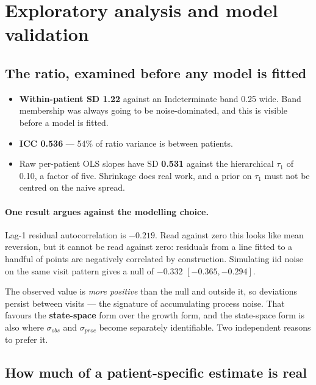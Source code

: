 \documentclass[11pt,a4paper]{article}
\begin{document}
\section{Exploratory analysis and model validation}

\subsection{The ratio, examined before any model is fitted}

\begin{itemize}
  \item \textbf{Within-patient SD 1.22} against an Indeterminate band 0.25 wide.
        Band membership was always going to be noise-dominated, and this is
        visible before a model is fitted.
  \item \textbf{ICC 0.536} --- 54\% of ratio variance is between patients.
  \item Raw per-patient OLS slopes have SD \textbf{0.531} against the
        hierarchical $\tau_1$ of 0.10, a factor of five. Shrinkage does real
        work, and a prior on $\tau_1$ must not be centred on the naive spread.
\end{itemize}

\paragraph{One result argues against the modelling choice.} Lag-1 residual
autocorrelation is $-0.219$. Read against zero this looks like mean reversion,
but it cannot be read against zero: residuals from a line fitted to a handful of
points are negatively correlated by construction. Simulating iid noise on the
same visit pattern gives a null of $\mathbf{-0.332}$ $[-0.365, -0.294]$.

The observed value is \emph{more positive} than the null and outside it, so
deviations persist between visits --- the signature of accumulating process
noise. That favours the \textbf{state-space} form over the growth form, and the
state-space form is also where $\sigma_{obs}$ and $\sigma_{proc}$ become
separately identifiable. Two independent reasons to prefer it.

\subsection{How much of a patient-specific estimate is real}
\end{document}
